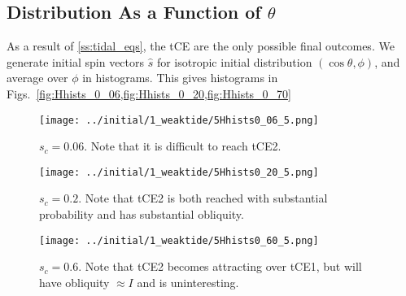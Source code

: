\documentclass[twocolumn]{aastex63}
\newcommand*{\p}[1]{\left(#1\right)}
\begin{document}
\subsection{Distribution As a Function of $\theta$}\label{ss:q_dist}

As a result of \autoref{ss:tidal_eqs}, the tCE are the only possible final
outcomes. We generate initial spin vectors $\hat{s}$ for isotropic initial
distribution $\p{\cos \theta, \phi}$, and average over $\phi$ in histograms.
This gives histograms in
Figs.~\ref{fig:Hhists_0_06,fig:Hhists_0_20,fig:Hhists_0_70}
\begin{figure}
    \centering
    \texttt{[image: ../initial/1\_weaktide/5Hhists0\_06\_5.png]}
    \caption{$s_c = 0.06$. Note that it is difficult to reach
    tCE2.}\label{fig:Hhists_0_06}
\end{figure}
\begin{figure}
    \centering
    \texttt{[image: ../initial/1\_weaktide/5Hhists0\_20\_5.png]}
    \caption{$s_c = 0.2$. Note that tCE2 is both reached with substantial
    probability and has substantial obliquity.}\label{fig:Hhists_0_20}
\end{figure}
\begin{figure}
    \centering
    \texttt{[image: ../initial/1\_weaktide/5Hhists0\_60\_5.png]}
    \caption{$s_c = 0.6$. Note that tCE2 becomes attracting over tCE1, but will
    have obliquity $\approx I$ and is uninteresting.}\label{fig:Hhists_0_70}
\end{figure}
\end{document}
